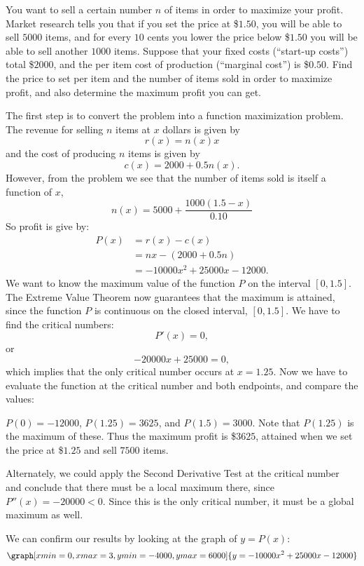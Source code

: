 \documentclass{ximera}
\begin{document}
\begin{example}
  You want to sell a certain number $n$ of items in order to maximize
  your profit.  Market research tells you that if you set the price at
  \$$1.50$, you will be able to sell $5000$ items, and for every $10$
  cents you lower the price below \$$1.50$ you will be able to sell
  another $1000$ items.  Suppose that your fixed costs (``start-up
  costs'') total \$$2000$, and the per item cost of production
  (``marginal cost'') is \$$0.50$.  Find the price to set per item and
  the number of items sold in order to maximize profit, and also
  determine the maximum profit you can get.
\begin{explanation}
The first step is to convert the problem into a function maximization
problem. The revenue for selling $n$ items at $x$ dollars is given by
\[
r(x) = n(x)x
\]
and the cost of producing $n$ items is given by
\[
c(x) = 2000+0.5 n(x). 
\]
However, from the problem we see that the number of items sold is
itself a function of $x$,
\[
n(x) =5000+\frac{1000(1.5-x)}{0.10}
\]
So profit is give by:
\begin{align*}
P(x) &= r(x) - c(x)\\
&= nx - (2000+0.5 n)\\
&=-10000x^2+25000x-12000. 
\end{align*}
We want to know the maximum value of the function $P$ on the interval $[0,1.5]$.
The Extreme Value Theorem now guarantees that the maximum is attained, since the function $P$ is continuous on the closed interval, $[0,1.5]$. 
We have to find the critical numbers:
\[
P'(x)=0,
\]
or
\[
-20000x+25000=0,
\]
which implies that the only critical number occurs at $x=1.25$.
Now we have to evaluate the function at the critical number and both endpoints, and compare the values:

$P(0)=-12000$, $P(1.25)=3625$, and $P(1.5)=3000$.
 Note that
$P(1.25)$ is the maximum of these. Thus the maximum profit is
\$$3625$, attained when we set the price at \$$1.25$ and sell $7500$ items.

Alternately, we could apply the Second Derivative Test at the critical number and conclude that
there must be a
local maximum there, since $P''(x)=-20000<0$. Since this is the only critical number,
it must be a global maximum as well. 
\begin{onlineOnly} 
   We can confirm our results by looking at the graph of $y=P(x)$:
   \[
   \graph[xmin=0,xmax=3,ymin=-4000,ymax=6000]{y=-10000x^2+25000x-12000}
   \]
\end{onlineOnly}
\end{explanation}
\end{example}
\end{document}
